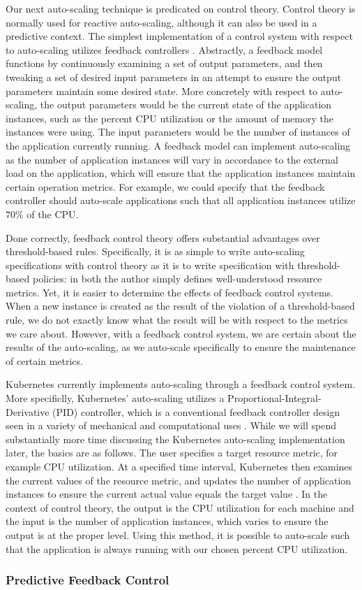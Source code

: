 Our next auto-scaling technique is predicated on control
theory. Control theory is normally used for reactive auto-scaling, although it
can also be used in a predictive context. The simplest implementation of a
control system with respect to auto-scaling utilizes feedback
controllers
\cite{auto-scaling-techniques-for-elastic-applications-in-cloud-environments}.
Abstractly, a feedback model functions by continuously examining a set of output parameters,
and then tweaking a set of desired input parameters in an attempt to ensure the
output parameters maintain some desired state. More concretely with respect to
auto-scaling, the output parameters would be the current state of the
application instances, such as the percent CPU utilization or the amount of
memory the instances were using. The input parameters would be the
number of instances of the application currently running. A feedback model
can implement auto-scaling as the number of application instances will vary in
accordance to the external load on the application, which will ensure that the
application instances maintain certain operation metrics. For example, we could
specify that the feedback controller should auto-scale applications such that
all application instances utilize $70\%$ of the CPU.

Done correctly, feedback control theory offers substantial advantages over
threshold-based rules. Specifically, it is as simple to write auto-scaling
specifications with control theory as it is to write specification with
threshold-based policies: in both the author simply defines well-understood
resource metrics. Yet, it is easier to determine the effects of feedback
control systems. When a new instance is created as the result of the violation
of a threshold-based rule, we do not exactly know what the result will be with
respect to the metrics we care about. However, with a feedback control system,
we are certain about the results of the auto-scaling, as we auto-scale
specifically to ensure the maintenance of certain metrics.

Kubernetes currently implements auto-scaling through a feedback control system.
More specificlly, Kubernetes' auto-scaling utilizes a
Proportional-Integral-Derivative (PID) controller, which is a
conventional feedback controller design seen in a variety of mechanical and
computational uses \cite{pid-controller}.
While we will spend substantially more time discussing the Kubernetes auto-scaling
implementation later, the basics are as follows. The user specifies a target resource
metric, for example CPU utilization. At a specified time interval,
Kubernetes then examines the current values
of the resource metric, and updates the number of application instances to
ensure the current actual value equals the target
value \cite{k8s-horizontal-pod-autoscaler-proposal}. In the context of control
theory, the output is the CPU utilization for each machine and the input is the
number of application instances, which varies to ensure the output is at the
proper level. Using this method, it is possible to auto-scale such that the
application is always running with our chosen percent CPU utilization.

\subsubsection{Predictive Feedback Control}


